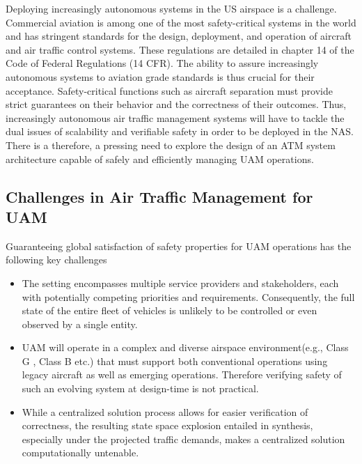 Deploying increasingly autonomous systems in the US airspace is a challenge. Commercial aviation is among one of the most safety-critical systems in the world and has stringent standards for the design, deployment, and operation of aircraft and air traffic control systems. These regulations are detailed in chapter 14 of the Code of Federal Regulations (14 CFR). The ability to assure increasingly autonomous systems to aviation grade standards is thus crucial for their acceptance.  Safety-critical functions such as aircraft separation must provide strict guarantees on their behavior and the correctness of their outcomes.  Thus, increasingly autonomous air traffic management systems will have to tackle the dual issues of scalability and verifiable safety in order to be deployed in the NAS. There is a therefore, a pressing need to explore the design of an ATM system architecture capable of safely and efficiently managing UAM operations. 

\subsection{Challenges in Air Traffic Management for UAM}

Guaranteeing global satisfaction of safety properties for UAM operations has the following key challenges

\begin{itemize}
    \item The setting encompasses multiple service providers and stakeholders, each with potentially competing priorities and requirements. Consequently, the full state of the entire fleet of vehicles is unlikely to be controlled or even observed by a single entity. 
    \item UAM will operate in a complex and diverse airspace environment(e.g., Class G \cite{FAA2014}, Class B etc.) that must support both conventional operations using legacy aircraft as well as emerging operations. Therefore verifying safety of such an evolving system at design-time is not practical.
    \item While a centralized solution process allows for easier verification of correctness, the resulting state space explosion entailed in synthesis, especially under the projected traffic demands, makes a centralized solution computationally untenable. 
\end{itemize}


